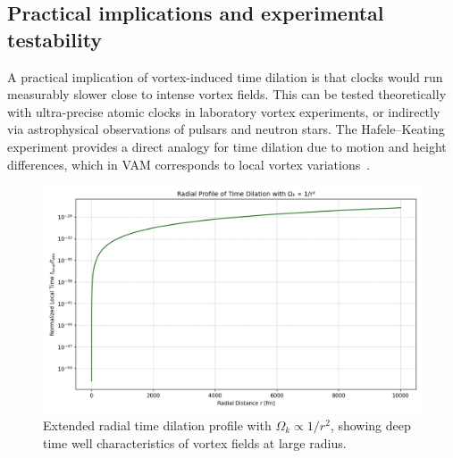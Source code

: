 \subsection{Practical implications and experimental testability}

A practical implication of vortex-induced time dilation is that clocks would run measurably slower close to intense vortex fields. This can be tested theoretically with ultra-precise atomic clocks in laboratory vortex experiments, or indirectly via astrophysical observations of pulsars and neutron stars. The Hafele–Keating experiment provides a direct analogy for time dilation due to motion and height differences, which in VAM corresponds to local vortex variations~\cite{hafele1972around}.

\begin{figure}[ht!]
    \centering
    \includegraphics[width=0.7\linewidth]{images/05-LogarithmicDecayLocalTime}
    \caption{Extended radial time dilation profile with $\Omega_k \propto 1/r^2$, showing deep time well characteristics of vortex fields at large radius.}
    \label{fig:NewGraph}
\end{figure}